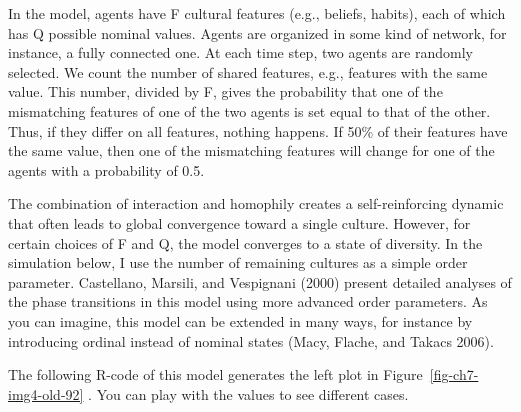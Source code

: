 \documentclass[
  a4paper,
  DIV=11,
  numbers=noendperiod]{scrreprt}
\begin{document}
In the model, agents have F cultural features (e.g., beliefs, habits),
each of which has Q possible nominal values. Agents are organized in
some kind of network, for instance, a fully connected one. At each time
step, two agents are randomly selected. We count the number of shared
features, e.g., features with the same value. This number, divided by F,
gives the probability that one of the mismatching features of one of the
two agents is set equal to that of the other. Thus, if they differ on
all features, nothing happens. If 50\% of their features have the same
value, then one of the mismatching features will change for one of the
agents with a probability of 0.5.

The combination of interaction and homophily creates a self-reinforcing
dynamic that often leads to global convergence toward a single culture.
However, for certain choices of F and Q, the model converges to a state
of diversity. In the simulation below, I use the number of remaining
cultures as a simple order parameter. Castellano, Marsili, and
Vespignani (2000) present detailed analyses of the phase transitions in
this model using more advanced order parameters. As you can imagine,
this model can be extended in many ways, for instance by introducing
ordinal instead of nominal states (Macy, Flache, and Takacs 2006).

The following R-code of this model generates the left plot in
Figure~\ref{fig-ch7-img4-old-92} . You can play with the values to see
different cases.
\end{document}
